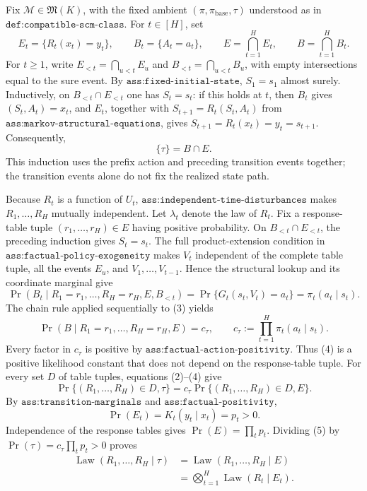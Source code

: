 Fix \(\mathcal M\in\mathfrak M(K)\), with the fixed ambient \((\pi,\pi_{\mathrm{base}},\tau)\) understood as in \(\texttt{def:compatible-scm-class}\).  For \(t\in[H]\), set
\[
 E_t=\{R_t(x_t)=y_t\},\qquad B_t=\{A_t=a_t\},
 \qquad E=\bigcap_{t=1}^H E_t,\qquad B=\bigcap_{t=1}^H B_t.
 \tag{1}
\]
For \(t\ge1\), write \(E_{<t}=\bigcap_{u<t}E_u\) and \(B_{<t}=\bigcap_{u<t}B_u\), with empty intersections equal to the sure event.  By \(\texttt{ass:fixed-initial-state}\), \(S_1=s_1\) almost surely.  Inductively, on \(B_{<t}\cap E_{<t}\) one has \(S_t=s_t\): if this holds at \(t\), then \(B_t\) gives \((S_t,A_t)=x_t\), and \(E_t\), together with \(S_{t+1}=R_t(S_t,A_t)\) from \(\texttt{ass:markov-structural-equations}\), gives \(S_{t+1}=R_t(x_t)=y_t=s_{t+1}\).  Consequently,
\[
 \{\tau\}=B\cap E. \tag{2}
\]
This induction uses the prefix action and preceding transition events together; the transition events alone do not fix the realized state path.

Because \(R_t\) is a function of \(U_t\), \(\texttt{ass:independent-time-disturbances}\) makes \(R_1,\ldots,R_H\) mutually independent.  Let \(\lambda_t\) denote the law of \(R_t\).  Fix a response-table tuple \((r_1,\ldots,r_H)\in E\) having positive probability.  On \(B_{<t}\cap E_{<t}\), the preceding induction gives \(S_t=s_t\).  The full product-extension condition in \(\texttt{ass:factual-policy-exogeneity}\) makes \(V_t\) independent of the complete table tuple, all the events \(E_u\), and \(V_1,\ldots,V_{t-1}\).  Hence the structural lookup and its coordinate marginal give
\[
 \Pr\!\left(B_t\mid R_1=r_1,\ldots,R_H=r_H,E,B_{<t}\right)
 =\Pr\{G_t(s_t,V_t)=a_t\}=\pi_t(a_t\mid s_t). \tag{3}
\]
The chain rule applied sequentially to (3) yields
\[
 \Pr\!\left(B\mid R_1=r_1,\ldots,R_H=r_H,E\right)
 =c_\tau,
 \qquad c_\tau:=\prod_{t=1}^H\pi_t(a_t\mid s_t). \tag{4}
\]
Every factor in \(c_\tau\) is positive by \(\texttt{ass:factual-action-positivity}\).  Thus (4) is a positive likelihood constant that does not depend on the response-table tuple.  For every set \(D\) of table tuples, equations (2)--(4) give
\[
 \Pr\{(R_1,\ldots,R_H)\in D,\tau\}
 =c_\tau\Pr\{(R_1,\ldots,R_H)\in D,E\}. \tag{5}
\]
By \(\texttt{ass:transition-marginals}\) and \(\texttt{ass:factual-positivity}\),
\[
 \Pr(E_t)=K_t(y_t\mid x_t)=p_t>0. \tag{6}
\]
Independence of the response tables gives \(\Pr(E)=\prod_t p_t\).  Dividing (5) by \(\Pr(\tau)=c_\tau\prod_t p_t>0\) proves
\[
 \begin{aligned}
 \operatorname{Law}(R_1,\ldots,R_H\mid\tau)
 &=\operatorname{Law}(R_1,\ldots,R_H\mid E)\\
 &=\bigotimes_{t=1}^H\operatorname{Law}(R_t\mid E_t).
 \end{aligned} \tag{7}
\]

